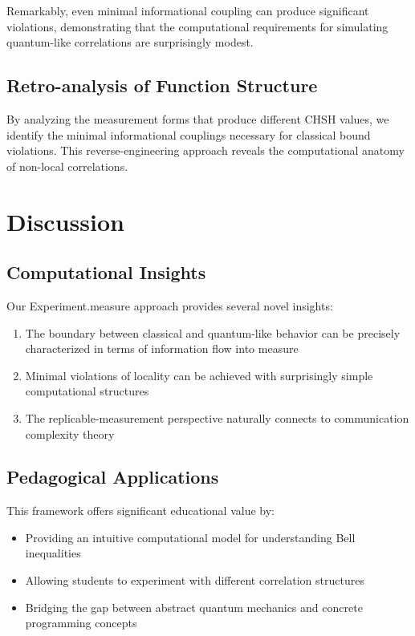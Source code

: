 \documentclass[11pt,a4paper]{article}
\begin{document}
Remarkably, even minimal informational coupling can produce significant violations, demonstrating that the computational requirements for simulating quantum-like correlations are surprisingly modest.

\subsection{Retro-analysis of Function Structure}

By analyzing the measurement forms that produce different CHSH values, we identify the minimal informational couplings necessary for classical bound violations. This reverse-engineering approach reveals the computational anatomy of non-local correlations.

\section{Discussion}

\subsection{Computational Insights}

Our Experiment.measure approach provides several novel insights:

\begin{enumerate}
\item The boundary between classical and quantum-like behavior can be precisely characterized in terms of information flow into measure
\item Minimal violations of locality can be achieved with surprisingly simple computational structures
\item The replicable-measurement perspective naturally connects to communication complexity theory~\cite{toner2003}
\end{enumerate}

\subsection{Pedagogical Applications}

This framework offers significant educational value by:

\begin{itemize}
\item Providing an intuitive computational model for understanding Bell inequalities
\item Allowing students to experiment with different correlation structures
\item Bridging the gap between abstract quantum mechanics and concrete programming concepts
\end{itemize}
\end{document}
